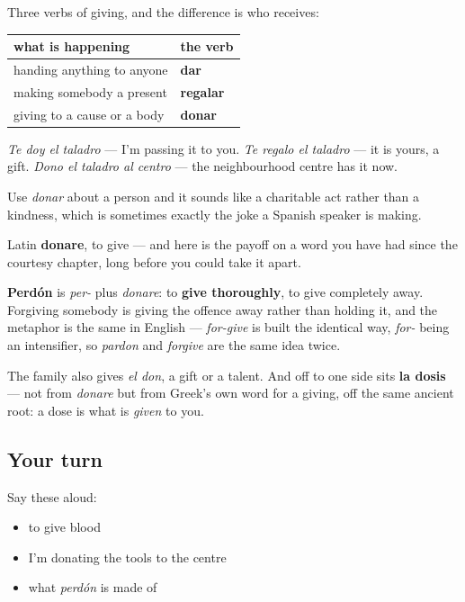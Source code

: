 \begin{grammarlens}[title={Grammar Lens: donar is not regalar}]
Three verbs of giving, and the difference is who receives:

\noindent
\begin{tabularx}{\linewidth}{@{}>{\raggedright\arraybackslash}X>{\raggedright\arraybackslash}X@{}}
\toprule
\textbf{what is happening} & \textbf{the verb} \\
\midrule
handing anything to anyone & \textbf{dar} \\
making somebody a present & \textbf{regalar} \\
giving to a cause or a body & \textbf{donar} \\
\bottomrule
\end{tabularx}

\emph{Te doy el taladro} — I'm passing it to you. \emph{Te regalo el taladro} — it is yours, a gift. \emph{Dono el taladro al centro} — the neighbourhood centre has it now.

Use \emph{donar} about a person and it sounds like a charitable act rather than a kindness, which is sometimes exactly the joke a Spanish speaker is making.
\end{grammarlens}

\begin{cousinweb}
Latin \textbf{donare}, to give — and here is the payoff on a word you have had since the courtesy chapter, long before you could take it apart.

\textbf{Perdón} is \emph{per-} plus \emph{donare}: to \textbf{give thoroughly}, to give completely away. Forgiving somebody is giving the offence away rather than holding it, and the metaphor is the same in English — \emph{for-give} is built the identical way, \emph{for-} being an intensifier, so \emph{pardon} and \emph{forgive} are the same idea twice.

The family also gives \emph{el don}, a gift or a talent. And off to one side sits \textbf{la dosis} — not from \emph{donare} but from Greek's own word for a giving, off the same ancient root: a dose is what is \emph{given} to you.
\end{cousinweb}

\subsection*{Your turn}
Say these aloud:

\begin{itemize}
\raggedright
  \item to give blood
  \item I'm donating the tools to the centre
  \item what \emph{perdón} is made of
\end{itemize}

